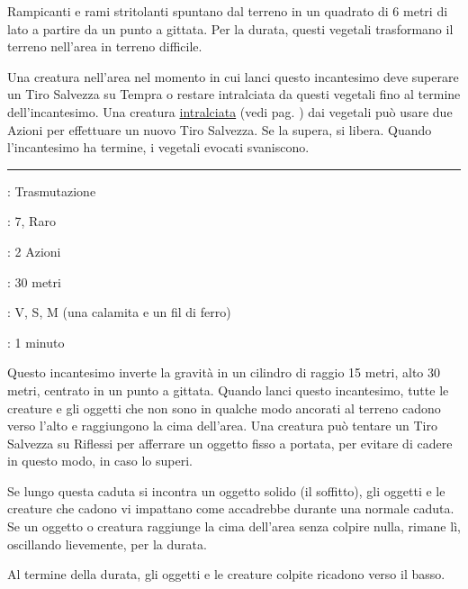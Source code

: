 \begin{multicols}{2}
Rampicanti e rami stritolanti spuntano dal terreno in un quadrato di 6 metri di lato a partire da un punto a gittata. Per la durata, questi vegetali trasformano il terreno nell'area in terreno difficile.

Una creatura nell'area nel momento in cui lanci questo incantesimo deve superare un Tiro Salvezza su Tempra o restare intralciata da questi vegetali fino al termine dell'incantesimo. Una creatura \hyperlink{intralciato}{intralciata} (vedi pag. \pageref{intralciato}) dai vegetali può usare due Azioni per effettuare un nuovo Tiro Salvezza. Se la supera, si libera. Quando l'incantesimo ha termine, i vegetali evocati svaniscono.

\smallskip\noindent\rule{\linewidth}{2pt} \hypertarget{Inversione della Gravità}{}\smallskip{}
\noindent
\begin{description}[noitemsep, topsep=0pt, parsep=0pt, partopsep=0pt, leftmargin=0cm, labelwidth=2.8cm]
	\item[\textbf{Lista di Magia}]: Trasmutazione
	\item[\textbf{Livello}]: 7, Raro
	\item[\textbf{T. di Lancio}]: 2 Azioni
	\item[\textbf{Gittata}]: 30 metri
	\item[\textbf{Componenti}]: V, S, M (una calamita e un fil di ferro)
	\item[\textbf{Durata}]: 1 minuto
\end{description}

Questo incantesimo inverte la gravità in un cilindro di raggio 15 metri, alto 30 metri, centrato in un punto a gittata. Quando lanci questo incantesimo, tutte le creature e gli oggetti che non sono in qualche modo ancorati al terreno cadono verso l'alto e raggiungono la cima dell'area. Una creatura può tentare un Tiro Salvezza su Riflessi per afferrare un oggetto fisso a portata, per evitare di cadere in questo modo, in caso lo superi.

Se lungo questa caduta si incontra un oggetto solido (il soffitto), gli oggetti e le creature che cadono vi impattano come accadrebbe durante una normale caduta. Se un oggetto o creatura raggiunge la cima dell'area senza colpire nulla, rimane lì, oscillando lievemente, per la durata.

Al termine della durata, gli oggetti e le creature colpite ricadono verso il basso.


\end{multicols}
